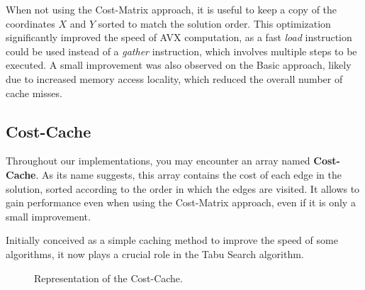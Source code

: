 When not using the Cost-Matrix approach, it is useful to keep a copy of the coordinates $X$ and $Y$ sorted to match the solution order.
This optimization significantly improved the speed of AVX computation, as a fast \textit{load} instruction could be used instead of a \textit{gather} instruction, which involves multiple steps to be executed.
A small improvement was also observed on the Basic approach, likely due to increased memory access locality, which reduced the overall number of cache misses.

\subsection{Cost-Cache}

Throughout our implementations, you may encounter an array named \textbf{Cost-Cache}.
As its name suggests, this array contains the cost of each edge in the solution, sorted according to the order in which the edges are visited.
It allows to gain performance even when using the Cost-Matrix approach, even if it is only a small improvement.

Initially conceived as a simple caching method to improve the speed of some algorithms, it now plays a crucial role in the Tabu Search algorithm.

\begin{figure}[htbp]
    \centering
    \caption{Representation of the Cost-Cache.}
    \label{fig:solRepresentationExample}
\end{figure}

